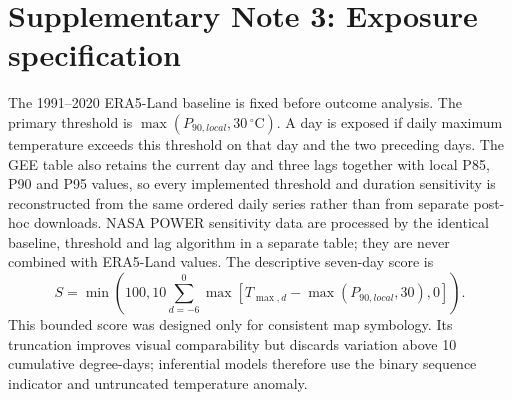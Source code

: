 \documentclass[11pt]{article}
\begin{document}
\section*{Supplementary Note 3: Exposure specification}
The 1991--2020 ERA5-Land baseline is fixed before outcome analysis. The primary threshold is $\max(P_{90,local},30\,^{\circ}\mathrm{C})$. A day is exposed if daily maximum temperature exceeds this threshold on that day and the two preceding days. The GEE table also retains the current day and three lags together with local P85, P90 and P95 values, so every implemented threshold and duration sensitivity is reconstructed from the same ordered daily series rather than from separate post-hoc downloads. NASA POWER sensitivity data are processed by the identical baseline, threshold and lag algorithm in a separate table; they are never combined with ERA5-Land values. The descriptive seven-day score is
\[
S=\min\left(100,10\sum_{d=-6}^{0}\max\left[T_{\max,d}-\max(P_{90,local},30),0\right]\right).
\]
This bounded score was designed only for consistent map symbology. Its truncation improves visual comparability but discards variation above 10 cumulative degree-days; inferential models therefore use the binary sequence indicator and untruncated temperature anomaly.
\end{document}

